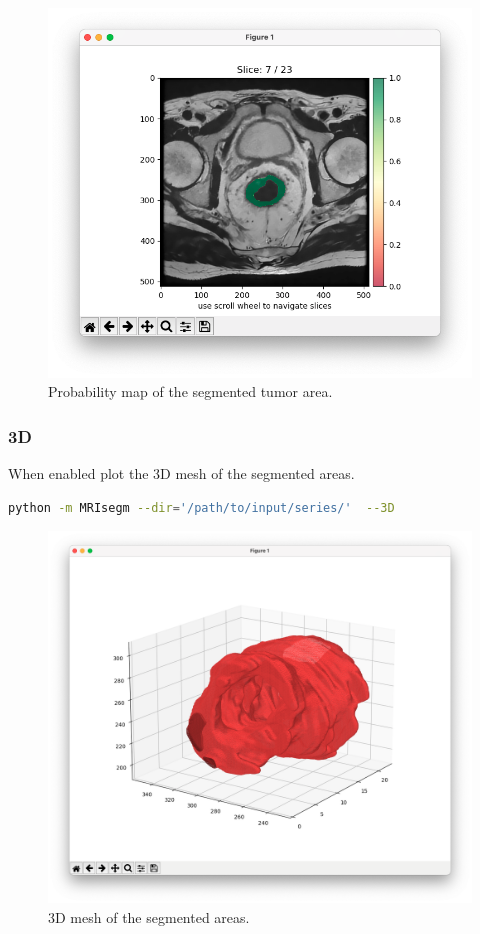 \documentclass{standalone}
\begin{document}
\begin{figure}[ht]

    \centering
    \includegraphics[width=\textwidth]{../images/example_density.png}

    \caption{Probability map of the segmented tumor area.}
    \label{density}
    
\end{figure}
\newpage

\subsubsection{3D}

When enabled plot the 3D mesh of the segmented areas.

\begin{lstlisting}[language = bash]
python -m MRIsegm --dir='/path/to/input/series/'  --3D
\end{lstlisting}

\begin{figure}[ht]

    \centering
    \includegraphics[width=\textwidth]{../images/example_3D.png}

    \caption{3D mesh of the segmented areas.}
    \label{3D}
    
\end{figure}
\end{document}
